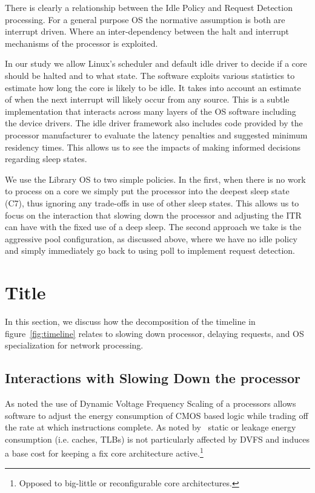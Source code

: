 There is clearly a relationship between the Idle Policy and Request Detection processing.  For a general purpose OS the normative assumption is both are interrupt driven.  Where an inter-dependency between the halt and interrupt mechanisms of the processor is exploited.  

In our study we allow Linux's scheduler and default idle driver to decide if a core should be halted and to what state.  The software exploits various statistics to estimate how long the core is likely to be idle. It takes into account an estimate of when the next interrupt will likely occur from any source.  This is a subtle implementation that interacts across many layers of the OS software including the device drivers.  The idle driver framework also includes code provided by the processor manufacturer to evaluate the latency penalties and suggested minimum residency times.  This allows us to see the impacts of making informed decisions regarding sleep states.  

We use the Library OS to two simple policies.  In the first, when there is no work to process on a core we simply put the processor into the deepest sleep state (C7), thus ignoring any trade-offs in use of other sleep states.   This allows us to focus on the interaction that slowing down the processor and adjusting the ITR can have with the fixed use of a deep sleep.   The second approach we take is the aggressive pool configuration, as discussed above, where we have no idle policy and simply immediately go back to using poll to implement request detection.

\section{Title}
In this section, we discuss how the decomposition of the timeline in figure~\ref{fig:timeline} relates to slowing down processor, delaying requests, and OS specialization for network processing.

\subsection{Interactions with Slowing Down the processor}
\label{sec:workflow:dvfs}

As noted the use of Dynamic Voltage Frequency Scaling of a processors allows software to adjust the energy consumption of CMOS based logic while trading off the rate at which instructions complete.  As noted by~\cite{slowdownorsleep, 10.1109/40.888701, pacingtoidle, udpm} static or leakage energy consumption (i.e. caches, TLBs) is not particularly affected by DVFS and induces a base cost for keeping a fix core architecture active.\footnote{Opposed to big-little or reconfigurable core architectures.}

